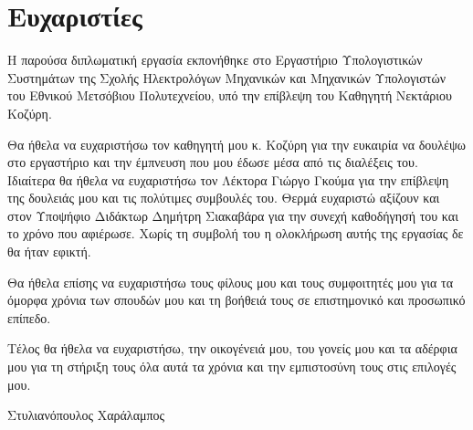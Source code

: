 
\section*{Ευχαριστίες}

H παρούσα διπλωματική εργασία εκπονήθηκε στο Εργαστήριο Υπολογιστικών Συστημάτων της Σχολής Ηλεκτρολόγων Μηχανικών και Μηχανικών Υπολογιστών του Εθνικού Μετσόβιου Πολυτεχνείου, υπό την επίβλεψη του Καθηγητή Νεκτάριου Κοζύρη.

Θα ήθελα να ευχαριστήσω τον καθηγητή μου κ. Κοζύρη για την ευκαιρία να δουλέψω στο εργαστήριο και την έμπνευση που μου έδωσε μέσα από τις διαλέξεις του. Ιδιαίτερα θα ήθελα να ευχαριστήσω τον Λέκτορα Γιώργο Γκούμα για την επίβλεψη της δουλειάς μου και τις πολύτιμες συμβουλές του. Θερμά ευχαριστώ αξίζουν και στον Υποψήφιο Διδάκτωρ Δημήτρη Σιακαβάρα για την συνεχή καθοδήγησή του και το χρόνο που αφιέρωσε. Χωρίς τη συμβολή του η ολοκλήρωση αυτής της εργασίας δε θα ήταν εφικτή.

Θα ήθελα επίσης να ευχαριστήσω τους φίλους μου και τους συμφοιτητές μου για τα όμορφα χρόνια των σπουδών μου και τη βοήθειά τους σε επιστημονικό και προσωπικό επίπεδο.

Τέλος θα ήθελα να ευχαριστήσω, την οικογένειά μου, του γονείς μου και τα αδέρφια μου για τη στήριξη τους όλα αυτά τα χρόνια και την εμπιστοσύνη τους στις επιλογές μου.
\bigskip
\begin{flushright} 
Στυλιανόπουλος Χαράλαμπος
\end{flushright}
